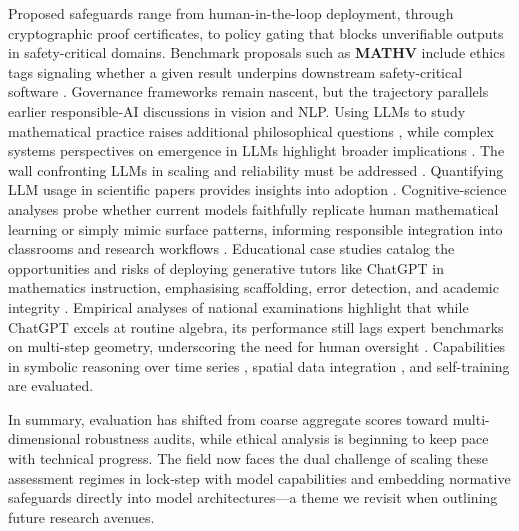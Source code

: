 \documentclass[acmsmall,anonymous]{acmart}
\begin{document}
Proposed safeguards range from human-in-the-loop deployment, through cryptographic proof certificates, to policy gating that blocks unverifiable outputs in safety-critical domains.  Benchmark proposals such as \textbf{MATHV} include ethics tags signaling whether a given result underpins downstream safety-critical software \cite{wang2024mathv}.  Governance frameworks remain nascent, but the trajectory parallels earlier responsible‐AI discussions in vision and NLP. Using LLMs to study mathematical practice raises additional philosophical questions \cite{dalessandro2025usingllmmathpractice,anonymous2025usingllmmathpractice}, while complex systems perspectives on emergence in LLMs highlight broader implications \cite{mitchell2025largescaleemergence,anonymous2025largescaleemergence}. The wall confronting LLMs in scaling and reliability must be addressed \cite{coveney2025wall,anonymous2025wall}. Quantifying LLM usage in scientific papers provides insights into adoption \cite{liang2025quantifying}.  Cognitive-science analyses probe whether current models faithfully replicate human mathematical learning or simply mimic surface patterns, informing responsible integration into classrooms and research workflows \cite{binz-2023-cognitive-models,zhang-2023-ai-math-cognitive}.  Educational case studies catalog the opportunities and risks of deploying generative tutors like ChatGPT in mathematics instruction, emphasising scaffolding, error detection, and academic integrity \cite{fang-2023-education-chatgpt}.  Empirical analyses of national examinations highlight that while ChatGPT excels at routine algebra, its performance still lags expert benchmarks on multi-step geometry, underscoring the need for human oversight \cite{dao2023investigatingeffectivenesschatgptmathematical}. Capabilities in symbolic reasoning over time series \cite{liu2025can}, spatial data integration \cite{han2025can}, and self-training \cite{shafayat2025can} are evaluated.

\bigskip
In summary, evaluation has shifted from coarse aggregate scores toward multi-dimensional robustness audits, while ethical analysis is beginning to keep pace with technical progress.  The field now faces the dual challenge of scaling these assessment regimes in lock-step with model capabilities and embedding normative safeguards directly into model architectures—a theme we revisit when outlining future research avenues.


\end{document}
